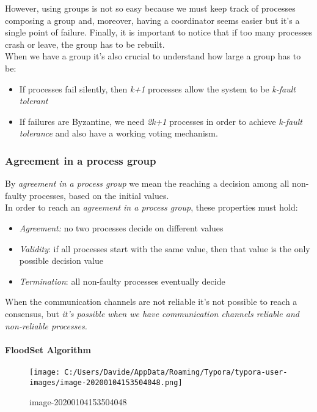 However, using groups is not so easy because we must keep track of
processes composing a group and, moreover, having a coordinator seems easier but it's a single point of failure.
Finally, it is important to notice that if too many processes crash or leave, the group has to be rebuilt.\\
When we have a group it's also crucial to understand how large a group has to be:

\begin{itemize}
\itemsep1pt\parskip0pt
\item
  If processes fail silently, then \emph{k+1} processes allow the system
  to be \emph{k-fault tolerant}
\item
  If failures are Byzantine, we need \emph{2k+1} processes in order to
  achieve \emph{k-fault tolerance} and also have a working voting
  mechanism.
\end{itemize}

\subsubsection{Agreement in a process group}\label{agreement-in-a-process-group}
By \textit{agreement in a process group} we mean the reaching a decision among all non-faulty processes, based on the initial values.\\
In order to reach an \textit{agreement in a process group}, these properties must hold:

\begin{itemize}
\itemsep1pt\parskip0pt
\item
  \emph{Agreement:} no two processes decide on different values
\item
  \emph{Validity}: if all processes start with the same value, then that
  value is the only possible decision value
\item
  \emph{Termination}: all non-faulty processes eventually decide
\end{itemize}

When the communication channels are not reliable it's not possible to
reach a consensus, but \textit{it's possible when we have communication channels reliable and non-reliable processes.}

\paragraph{FloodSet Algorithm}\label{floodset-algorithm}

\begin{figure}[htbp]
\centering
\texttt{[image: C:/Users/Davide/AppData/Roaming/Typora/typora-user-images/image-20200104153504048.png]}
\caption{image-20200104153504048}
\end{figure}

